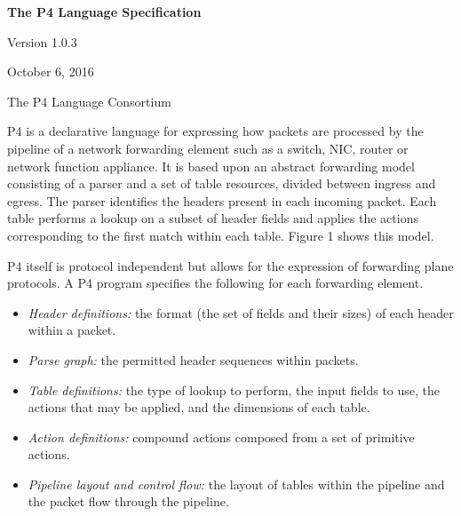 \documentclass[12pt]{article}
\begin{document}
\vspace{2cm}

\centerline{\sffamily\bfseries\huge The P4 Language Specification}
\vspace{3mm}
\centerline{\sffamily\Large Version 1.0.3}
\vspace{3mm}
\centerline{\sffamily\large October 6, 2016}
\vspace{8mm}
\centerline{\sffamily\large The P4 Language Consortium}

\date{September 13, 2016}
\thispagestyle{firstpagestyle}


P4 is a declarative language for expressing how packets are processed by the 
pipeline of a network forwarding element such as a switch, NIC, router or 
network function appliance. It is based upon an abstract forwarding model 
consisting of a parser and a set of \matchaction table resources, divided 
between ingress and egress. The parser identifies the headers present in 
each incoming packet. Each \matchaction table performs a lookup on a subset 
of header fields and applies the actions corresponding to the first match 
within each table. Figure 1 shows this model.

P4 itself is protocol independent but allows for the expression of forwarding 
plane protocols. A P4 program specifies the following for each forwarding 
element.

\begin{itemize}
\item
\textit{Header definitions:} the format (the set of fields and their
sizes) of each header within a packet.
\item
\textit{Parse graph:} the permitted header sequences within packets.
\item
\textit{Table definitions:} the type of lookup to perform, the input
fields to use, the actions that may be applied, and the dimensions of
each table.
\item
\textit{Action definitions:} compound actions composed from a set of
primitive actions.
\item
\textit{Pipeline layout and control flow:} the layout of tables within
the pipeline and the packet flow through the pipeline.
\end{itemize}
\end{document}

